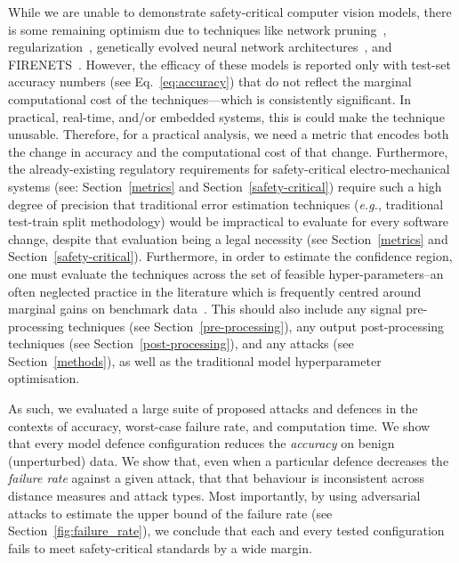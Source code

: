 \documentclass[journal]{IEEEtran}
\begin{document}
While we are unable to demonstrate safety-critical computer vision models, there is some remaining optimism due to techniques like network pruning~\cite{sehwag2019towards,cosentino2019search,jian2022pruning}, regularization~\cite{ross2018improving,jakubovitz2018improving}, genetically evolved neural network architectures~\cite{sinn2019evolutionary}, and FIRENETS~\cite{colbrook2021can}.
However, the efficacy of these models is reported only with test-set accuracy numbers (see Eq.~\ref{eq:accuracy}) that do not reflect the marginal computational cost of the techniques---which is consistently significant.
In practical, real-time, and/or embedded systems, this is could make the technique unusable.
Therefore, for a practical analysis, we need a metric that encodes both the change in accuracy and the computational cost of that change.
Furthermore, the already-existing regulatory requirements for safety-critical electro-mechanical systems (see: Section~\ref{metrics} and Section~\ref{safety-critical}) require such a high degree of precision that traditional error estimation techniques (\textit{e.g.}, traditional test-train split methodology) would be impractical to evaluate for every software change, despite that evaluation being a legal necessity (see Section~\ref{metrics} and Section~\ref{safety-critical}).
Furthermore, in order to estimate the confidence region, one must evaluate the techniques across the set of feasible hyper-parameters--an often neglected practice in the literature which is frequently centred around marginal gains on benchmark data~\cite{desislavov2021compute}.
This should also include any signal pre-processing techniques (see Section~\ref{pre-processing}), any output post-processing techniques (see Section~\ref{post-processing}), and any attacks (see Section~\ref{methods}), as well as the traditional model hyperparameter optimisation.

As such, we evaluated a large suite of proposed attacks and defences in the contexts of accuracy, worst-case failure rate, and computation time.
We show that every model defence configuration reduces the \textit{accuracy} on benign (unperturbed) data.
We show that, even when a particular defence decreases the \textit{failure rate} against a given attack, that that behaviour is inconsistent across distance measures and attack types.
Most importantly, by using adversarial attacks to estimate the upper bound of the failure rate (see Section~\ref{fig:failure_rate}), we conclude that each and every tested configuration fails to meet safety-critical standards by a wide margin.
\end{document}
